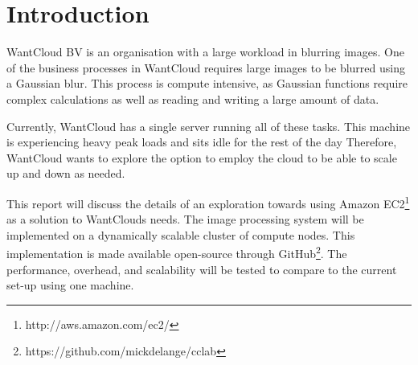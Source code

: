 \documentclass{acm_proc_article-sp}
\begin{document}
\title{}
\subtitle{}

\author{
\alignauthor
R.M. de Lange\\
		\\
\alignauthor
M. Voinea\\
		\\
\and
\alignauthor
D.H.J. Epema\\
\alignauthor
A. Iosup\\
\alignauthor
B.I. Ghit\\
}

\maketitle

\begin{abstract}
\end{abstract}

\section{Introduction}
WantCloud BV is an organisation with a large workload in blurring images.
One of the business processes in WantCloud requires large images to be blurred using a Gaussian blur.
This process is compute intensive, as Gaussian functions require complex calculations as well as reading and writing a large amount of data.

Currently, WantCloud has a single server running all of these tasks.
This machine is experiencing heavy peak loads and sits idle for the rest of the day
Therefore, WantCloud wants to explore the option to employ the cloud to be able to scale up and down as needed.

This report will discuss the details of an exploration towards using Amazon EC2\footnote{http://aws.amazon.com/ec2/} as a solution to WantClouds needs.
The image processing system will be implemented on a dynamically scalable cluster of compute nodes.
This implementation is made available open-source through GitHub\footnote{https://github.com/mickdelange/cclab}.
The performance, overhead, and scalability will be tested to compare to the current set-up using one machine.
\end{document}
